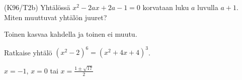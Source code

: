 \begin{tehtavasivu}
\begin{tehtava}
(K96/T2b) Yhtälössä $x^2-2ax+2a-1=0$ korvataan luku $a$ luvulla $a+1$. Miten muuttuvat yhtälön juuret?
\begin{vastaus}
     Toinen kasvaa kahdella ja toinen ei muutu.
    \end{vastaus}
\end{tehtava}

\begin{tehtava} %
	Ratkaise yhtälö $(x^2-2)^6=(x^2+4x+4)^3$.
	\begin{vastaus}
		$x=-1$, $x=0$ tai $x=\frac{1 \pm \sqrt{17}}{2}$
	\end{vastaus}
\end{tehtava}

\end{tehtavasivu}
